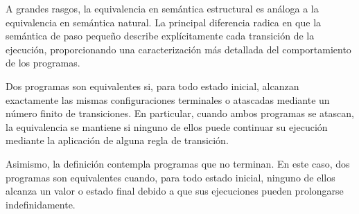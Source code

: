 A grandes rasgos, la equivalencia en semántica estructural es análoga a la equivalencia en semántica natural. La principal diferencia radica en que la semántica de paso pequeño describe explícitamente cada transición de la ejecución, proporcionando una caracterización más detallada del comportamiento de los programas.

Dos programas son equivalentes si, para todo estado inicial, alcanzan exactamente las mismas configuraciones terminales o atascadas mediante un número finito de transiciones. En particular, cuando ambos programas se atascan, la equivalencia se mantiene si ninguno de ellos puede continuar su ejecución mediante la aplicación de alguna regla de transición.

Asimismo, la definición contempla programas que no terminan. En este caso, dos programas son equivalentes cuando, para todo estado inicial, ninguno de ellos alcanza un valor o estado final debido a que sus ejecuciones pueden prolongarse indefinidamente.
